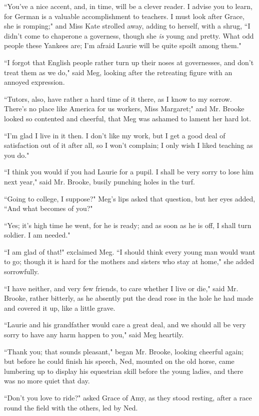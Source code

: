 ``You've a nice accent, and, in time, will be a clever
reader. I advise you to learn, for German is a valuable accomplishment
to teachers. I must look after Grace, she is romping;" and Miss Kate
strolled away, adding to herself, with a shrug, ``I
didn't come to chaperone a governess, though she
\emph{is} young and pretty. What odd people these Yankees are;
I'm afraid Laurie will be quite spoilt among them."

``I forgot that English people rather turn up their noses at governesses,
and don't treat them as we do," said Meg, looking after
the retreating figure with an annoyed expression.

``Tutors, also, have rather a hard time of it there, as I know to my
sorrow. There's no place like America for us workers,
Miss Margaret;" and Mr. Brooke looked so contented and cheerful, that
Meg was ashamed to lament her hard lot.

``I'm glad I live in it then. I don't
like my work, but I get a good deal of satisfaction out of it after all,
so I won't complain; I only wish I liked teaching as you
do."

``I think you would if you had Laurie for a pupil. I shall be very sorry
to lose him next year," said Mr. Brooke, busily punching holes in the
turf.

``Going to college, I suppose?" Meg's lips asked that
question, but her eyes added, ``And what becomes of you?"

``Yes; it's high time he went, for he is ready; and as
soon as he is off, I shall turn soldier. I am needed."

``I am glad of that!" exclaimed Meg. ``I should think every young man
would want to go; though it is hard for the mothers and sisters who stay
at home," she added sorrowfully.

``I have neither, and very few friends, to care whether I live or die,"
said Mr. Brooke, rather bitterly, as he absently put the dead rose in
the hole he had made and covered it up, like a little grave.

``Laurie and his grandfather would care a great deal, and we should all
be very sorry to have any harm happen to you," said Meg heartily.

``Thank you; that sounds pleasant," began Mr. Brooke, looking cheerful
again; but before he could finish his speech, Ned, mounted on the old
horse, came lumbering up to display his equestrian skill before the
young ladies, and there was no more quiet that day.

``Don't you love to ride?" asked Grace of Amy, as they
stood resting, after a race round the field with the others, led by Ned.

